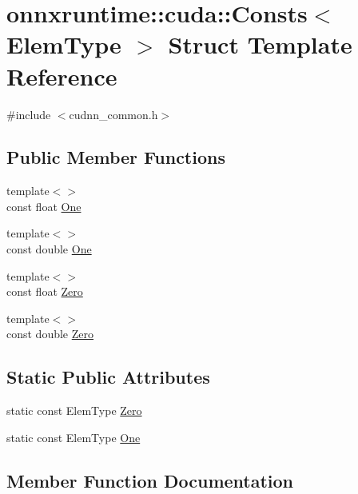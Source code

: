 \hypertarget{structonnxruntime_1_1cuda_1_1Consts}{}\section{onnxruntime\+:\+:cuda\+:\+:Consts$<$ Elem\+Type $>$ Struct Template Reference}
\label{structonnxruntime_1_1cuda_1_1Consts}


{\ttfamily \#include $<$cudnn\+\_\+common.\+h$>$}

\subsection*{Public Member Functions}
\begin{DoxyCompactItemize}
\item 
{\footnotesize template$<$$>$ }\\const float \mbox{\hyperlink{structonnxruntime_1_1cuda_1_1Consts_ac28d3de79c761e768ae97cc8cd411867}{One}}
\item 
{\footnotesize template$<$$>$ }\\const double \mbox{\hyperlink{structonnxruntime_1_1cuda_1_1Consts_a0730b21ab3507e324c268ff7144e23e9}{One}}
\item 
{\footnotesize template$<$$>$ }\\const float \mbox{\hyperlink{structonnxruntime_1_1cuda_1_1Consts_a9f77ca6ce91b9f7db9138e20c0ff2faf}{Zero}}
\item 
{\footnotesize template$<$$>$ }\\const double \mbox{\hyperlink{structonnxruntime_1_1cuda_1_1Consts_a1a7393e3e210a4a21452837318e877cd}{Zero}}
\end{DoxyCompactItemize}
\subsection*{Static Public Attributes}
\begin{DoxyCompactItemize}
\item 
static const Elem\+Type \mbox{\hyperlink{structonnxruntime_1_1cuda_1_1Consts_ab6f7227147bc807338f6039a190cdcda}{Zero}}
\item 
static const Elem\+Type \mbox{\hyperlink{structonnxruntime_1_1cuda_1_1Consts_a73d7ebc26d74926613591143f5c10c17}{One}}
\end{DoxyCompactItemize}


\subsection{Member Function Documentation}
\mbox{\label{structonnxruntime_1_1cuda_1_1Consts_ac28d3de79c761e768ae97cc8cd411867}} 
